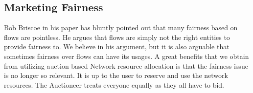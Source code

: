 \documentclass[a4paper,11pt,twocolumn]{article}
\begin{document}
\subsection{Marketing Fairness  }
Bob Briscoe in his paper\cite{bob} has bluntly pointed out that many fairness based on flows are pointless. He argues that
 flows are simply not the right
entities to provide fairness to. We believe in his argument, but it is also arguable that sometimes fairness over flows
can have its usages. 
A great benefits that we obtain from utilizing auction based Network resource allocation is that the fairness issue is no longer so relevant. It is up to the user to reserve and use the network resources. The Auctioneer treats everyone equally as they all have to bid.



\end{document}
